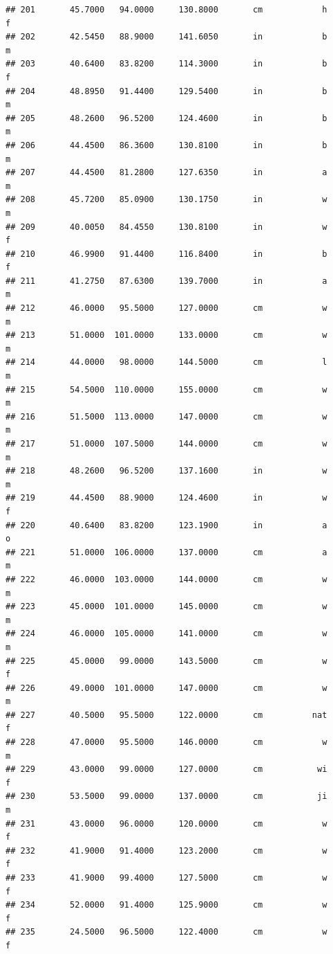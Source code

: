 \documentclass[]{article}
\begin{document}
\begin{verbatim}
## 201       45.7000   94.0000     130.8000       cm            h         f
## 202       42.5450   88.9000     141.6050       in            b         m
## 203       40.6400   83.8200     114.3000       in            b         f
## 204       48.8950   91.4400     129.5400       in            b         m
## 205       48.2600   96.5200     124.4600       in            b         m
## 206       44.4500   86.3600     130.8100       in            b         m
## 207       44.4500   81.2800     127.6350       in            a         m
## 208       45.7200   85.0900     130.1750       in            w         m
## 209       40.0050   84.4550     130.8100       in            w         f
## 210       46.9900   91.4400     116.8400       in            b         f
## 211       41.2750   87.6300     139.7000       in            a         m
## 212       46.0000   95.5000     127.0000       cm            w         m
## 213       51.0000  101.0000     133.0000       cm            w         m
## 214       44.0000   98.0000     144.5000       cm            l         m
## 215       54.5000  110.0000     155.0000       cm            w         m
## 216       51.5000  113.0000     147.0000       cm            w         m
## 217       51.0000  107.5000     144.0000       cm            w         m
## 218       48.2600   96.5200     137.1600       in            w         m
## 219       44.4500   88.9000     124.4600       in            w         f
## 220       40.6400   83.8200     123.1900       in            a         o
## 221       51.0000  106.0000     137.0000       cm            a         m
## 222       46.0000  103.0000     144.0000       cm            w         m
## 223       45.0000  101.0000     145.0000       cm            w         m
## 224       46.0000  105.0000     141.0000       cm            w         m
## 225       45.0000   99.0000     143.5000       cm            w         f
## 226       49.0000  101.0000     147.0000       cm            w         m
## 227       40.5000   95.5000     122.0000       cm          nat         f
## 228       47.0000   95.5000     146.0000       cm            w         m
## 229       43.0000   99.0000     127.0000       cm           wi         f
## 230       53.5000   99.0000     137.0000       cm           ji         m
## 231       43.0000   96.0000     120.0000       cm            w         f
## 232       41.9000   91.4000     123.2000       cm            w         f
## 233       41.9000   99.4000     127.5000       cm            w         f
## 234       52.0000   91.4000     125.9000       cm            w         f
## 235       24.5000   96.5000     122.4000       cm            w         f

\end{verbatim}
\end{document}
